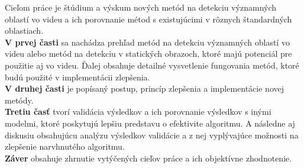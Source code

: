 Cieľom práce je štúdium a výskum nových metód na detekciu významných oblastí vo videu a ich porovnanie métod s existujúcimi v rôznych štandardných oblastiach.
\\
\textbf{V prvej časti} sa nachádza prehľad metód na detekciu významných oblastí vo videu alebo metód na detekciu v statických obrazoch, ktoré majú potenciál pre použitie aj vo videu.
Ďalej obsahuje detailné vysvetlenie fungovania metód, ktoré budú použité v implementácii zlepšenia.
\\
\textbf{V druhej časti} je popísaný postup, princíp zlepšenia a implementácie novej metódy.
\\
\textbf{Tretiu časť} tvorí validácia výsledkov a ich porovnanie výsledkov s inými modelmi, ktoré poskytujú lepšiu predstavu o efektivite algoritmu. A následne aj diskusiu obsahujúcu analýzu výsledkov validácie a z nej vyplývajúce možnosti na zlepšenie narvhnutého algoritmu.
\\
\textbf{Záver} obsahuje zhrnutie vytýčených cieľov práce a ich objektívne zhodnotenie.
